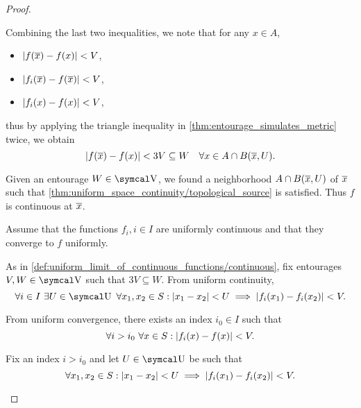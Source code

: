 \begin{proof}
\begin{description}
\begin{description}
      Combining the last two inequalities, we note that for any \( x \in A \),
      \begin{itemize}
        \item \( \left\vert f(\overline{x}) - f(x) \right\vert < V \),
        \item \( \left\vert f_i(\overline{x}) - f(\overline{x}) \right\vert < V \),
        \item \( \left\vert f_i(x) - f(x) \right\vert < V \),
      \end{itemize}
      thus by applying the triangle inequality in \cref{thm:entourage_simulates_metric} twice, we obtain
      \begin{equation*}
        \left\vert f(\overline{x}) - f(x) \right\vert < 3V \subseteq W \quad\forall x \in A \cap B(\overline{x}, U).
      \end{equation*}

      Given an entourage \( W \in \V \), we found a neighborhood \( A \cap B(\overline{x}, U) \) of \( \overline{x} \) such that \cref{thm:uniform_space_continuity/topological_source} is satisfied. Thus \( f \) is continuous at \( \overline{x} \).

       Assume that the functions \( f_i, i \in I \) are uniformly continuous and that they converge to \( f \) uniformly.

      As in \cref{def:uniform_limit_of_continuous_functions/continuous}, fix entourages \( V, W \in \V \) such that \( 3V \subseteq W \). From uniform continuity,
      \begin{equation*}
        \forall i \in I \ \exists U \in \U \ \forall x_1, x_2 \in S : \Abs{x_1 - x_2} < U \implies \Abs{f_i(x_1) - f_i(x_2)} < V.
      \end{equation*}

      From uniform convergence, there exists an index \( i_0 \in I \) such that
      \begin{equation*}
        \forall i > i_0 \ \forall x \in S : \left\vert f_i(x) - f(x) \right\vert < V.
      \end{equation*}

      Fix an index \( i > i_0 \) and let \( U \in \U \) be such that
      \begin{equation}\label{def:uniform_limit_of_continuous_functions/uniform/continuity}
        \forall x_1, x_2 \in S : \left\vert x_1 - x_2 \right\vert < U \implies \left\vert f_i(x_1) - f_i(x_2) \right\vert < V.
      \end{equation}


\end{description}
\end{description}
\end{proof}
